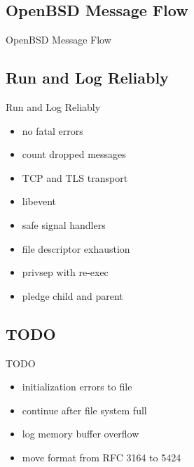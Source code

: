 \documentclass[14pt]{beamer}
\begin{document}
\subsection{OpenBSD Message Flow}
\begin{frame}{OpenBSD Message Flow}
\end{frame}

\subsection{Run and Log Reliably}
\begin{frame}{Run and Log Reliably}
\begin{itemize}
    \item no fatal errors
    \item count dropped messages
    \item TCP and TLS transport
    \item libevent
    \item safe signal handlers
    \item file descriptor exhaustion
    \item privsep with re-exec
    \item pledge child and parent
\end{itemize}
\end{frame}

\subsection{TODO}
\begin{frame}{TODO}
\begin{itemize}
    \item initialization errors to file
    \item continue after file system full
    \item log memory buffer overflow
    \item move format from RFC 3164 to 5424
\end{itemize}
\end{frame}
\end{document}
